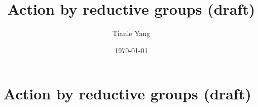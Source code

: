 \documentclass{noteformyself}
\title{Action by reductive groups (draft)}
\author{Tianle Yang}
\date{\today}
\begin{document}
    \maketitle

    \section{Action by reductive groups (draft)}



\end{document}
